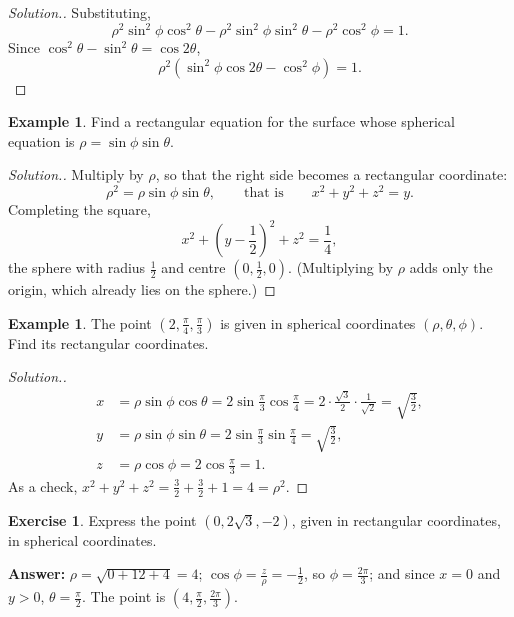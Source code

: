 \documentclass[11pt,a4paper]{article}
\theoremstyle{definition}
\newtheorem{exa}[thm]{Example}
\newtheorem{exe}[thm]{Exercise}
\newenvironment{solution}
  {\renewcommand{\qedsymbol}{}\begin{proof}[\textit{Solution}.]}
  {\end{proof}}
\begin{document}
\begin{solution}
Substituting,
\[\rho^2\sin^2\phi \cos^2 \theta - \rho^2 \sin^2\phi \sin^2\theta -
\rho^2\cos^2\phi = 1 .\]
Since $\cos^2\theta - \sin^2 \theta = \cos 2\theta$,
\[\rho^2\left(\sin^2\phi \cos2\theta - \cos^2\phi\right) =1 .\]
\end{solution}

\begin{exa}
\label{ex:spheresph}
Find a rectangular equation for the surface whose spherical equation is
$\rho = \sin \phi \sin \theta$.
\end{exa}

\begin{solution}
Multiply by $\rho$, so that the right side becomes a rectangular coordinate:
\[\rho^2 = \rho\sin\phi\sin\theta,\qquad\text{that is}\qquad x^2 + y^2 + z^2 = y
.\]
Completing the square,
\[x^2 + \left(y - \frac12\right)^2 + z^2 = \frac{1}{4},\]
the sphere with radius $\frac{1}{2}$ and centre $\left(0, \frac12,0\right)$.
(Multiplying by $\rho$ adds only the origin, which already lies on the sphere.)
\end{solution}

\begin{exa}
\label{ex:pointsph}
The point $\left( 2, \frac{\pi}{4}, \frac{\pi}{3}\right)$ is given in spherical
coordinates $(\rho,\theta,\phi)$. Find its rectangular coordinates.
\end{exa}

\begin{solution}
\begin{align*}
x & = \rho \sin \phi \cos \theta = 2 \sin \frac{\pi}{3}\cos \frac{\pi}{4} =
2\cdot \frac{\sqrt{3}}{2}\cdot \frac{1}{\sqrt{2}}=\sqrt{\frac{3}{2}},\\
y & = \rho \sin \phi \sin\theta = 2 \sin \frac{\pi}{3} \sin \frac{\pi}{4} =
\sqrt{\frac{3}{2}},\\
z & = \rho \cos \phi = 2\cos \frac{\pi}{3} = 1 .
\end{align*}
As a check, $x^2 + y^2 + z^2 = \frac32 + \frac32 + 1 = 4 = \rho^2$.
\end{solution}

\begin{exe}
\label{exe:tospherical}
Express the point $(0,2\sqrt{3},-2)$, given in rectangular coordinates, in
spherical coordinates.

\textbf{Answer:} $\rho = \sqrt{0 + 12 + 4} = 4$; $\cos\phi = \frac{z}{\rho} =
-\frac12$, so $\phi = \frac{2\pi}{3}$; and since $x = 0$ and $y>0$,
$\theta = \frac{\pi}{2}$. The point is $\left(4, \frac{\pi}{2},
\frac{2\pi}{3}\right)$.
\end{exe}
\end{document}
